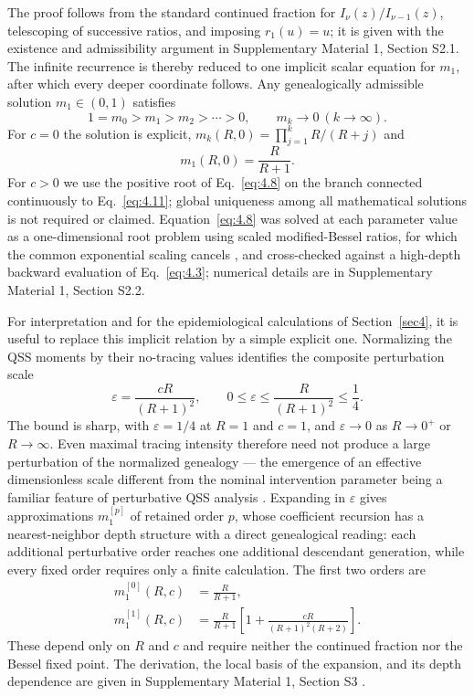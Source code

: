 \documentclass[review,12pt]{elsarticle}
\numberwithin{equation}{section}
\theoremstyle{remark}
\begin{document}
The proof follows from the standard continued fraction for $I_\nu(z)/I_{\nu-1}(z)$, telescoping of successive ratios, and imposing $r_1(u)=u$; it is given with the existence and admissibility argument in Supplementary Material 1, Section S2.1. The infinite recurrence is thereby reduced to one implicit scalar equation for $m_1$, after which every deeper coordinate follows. Any genealogically admissible solution $m_1\in(0,1)$ satisfies
\begin{equation}
1 = m_0 > m_1 > m_2 > \cdots > 0, \qquad m_k\to0 \ (k\to\infty).
\label{eq:4.9}
\end{equation}
For $c=0$ the solution is explicit, $m_k(R,0)=\prod_{j=1}^{k}R/(R+j)$ and
\begin{equation}
m_1(R,0) = \frac{R}{R+1}.
\label{eq:4.11}
\end{equation}
For $c>0$ we use the positive root of Eq.~\eqref{eq:4.8} on the branch connected continuously to Eq.~\eqref{eq:4.11}; global uniqueness among all mathematical solutions is not required or claimed. Equation~\eqref{eq:4.8} was solved at each parameter value as a one-dimensional root problem using scaled modified-Bessel ratios, for which the common exponential scaling cancels \cite{amos1974}, and cross-checked against a high-depth backward evaluation of Eq.~\eqref{eq:4.3}; numerical details are in Supplementary Material 1, Section S2.2.

For interpretation and for the epidemiological calculations of Section~\ref{sec4}, it is useful to replace this implicit relation by a simple explicit one. Normalizing the QSS moments by their no-tracing values identifies the composite perturbation scale
\begin{equation}
\varepsilon = \frac{cR}{(R+1)^2}, \qquad 0\leq\varepsilon\leq\frac{R}{(R+1)^2}\leq\frac14.
\label{eq:5.1}
\end{equation}
The bound is sharp, with $\varepsilon=1/4$ at $R=1$ and $c=1$, and $\varepsilon\to0$ as $R\to0^+$ or $R\to\infty$. Even maximal tracing intensity therefore need not produce a large perturbation of the normalized genealogy --- the emergence of an effective dimensionless scale different from the nominal intervention parameter being a familiar feature of perturbative QSS analysis \cite{segel1989}. Expanding in $\varepsilon$ gives approximations $m_1^{[p]}$ of retained order $p$, whose coefficient recursion has a nearest-neighbor depth structure with a direct genealogical reading: each additional perturbative order reaches one additional descendant generation, while every fixed order requires only a finite calculation. The first two orders are
\begin{align}
m_1^{[0]}(R,c) &= \frac{R}{R+1}, \label{eq:5.4a}\\
m_1^{[1]}(R,c) &= \frac{R}{R+1}\left[1+\frac{cR}{(R+1)^2(R+2)}\right]. \label{eq:5.4b}
\end{align}
These depend only on $R$ and $c$ and require neither the continued fraction nor the Bessel fixed point. The derivation, the local basis of the expansion, and its depth dependence are given in Supplementary Material 1, Section S3 \cite{krantz2002,murdock1999}.
\end{document}
